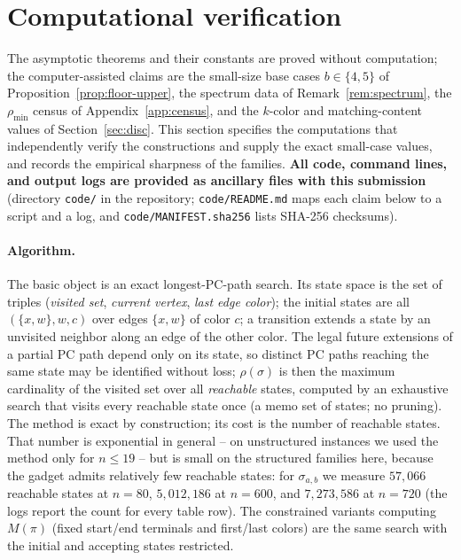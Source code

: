 \documentclass[11pt]{article}
\theoremstyle{definition}
\newcommand{\pmin}{\rho_{\min}}
\begin{document}
\section{Computational verification}\label{sec:comp}

The asymptotic theorems and their constants are proved without computation; the
computer-assisted claims are the small-size base cases $b \in \{4,5\}$ of
Proposition~\ref{prop:floor-upper}, the spectrum data of Remark~\ref{rem:spectrum},
the $\pmin$ census of Appendix~\ref{app:census}, and the $k$-color and
matching-content values of Section~\ref{sec:disc}. This section specifies the
computations that independently verify the constructions and supply the exact
small-case values, and records the empirical sharpness of the families.
\textbf{All code, command lines, and output logs are provided as ancillary files with
this submission} (directory \texttt{code/} in the repository; \texttt{code/README.md}
maps each claim
below to a script and a log, and \texttt{code/MANIFEST.sha256} lists SHA-256 checksums).

\paragraph{Algorithm.} The basic object is an exact longest-PC-path search. Its state
space is the set of triples (\emph{visited set}, \emph{current vertex}, \emph{last edge
color}); the initial states are all $(\{x, w\}, w, c)$ over edges $\{x, w\}$ of color
$c$; a transition extends a state by an unvisited neighbor along an edge of the other
color. The legal future extensions of a partial PC path depend only on its state, so
distinct PC paths reaching the same state may be identified without loss; $\rho(\sigma)$
is then the maximum cardinality of the visited set over all \emph{reachable} states,
computed by an exhaustive search that visits every reachable state once (a memo set of
states; no pruning). The method is exact by construction; its cost is the number of
reachable states. That number is exponential in general -- on unstructured instances we
used the method only for $n \le 19$ -- but is small on the structured families here,
because the gadget admits relatively few reachable states: for $\sigma_{a,b}$ we measure
$57{,}066$
reachable states at $n = 80$, $5{,}012{,}186$ at $n = 600$, and $7{,}273{,}586$ at
$n = 720$ (the logs report the count for every table row). The constrained variants
computing $M(\pi)$ (fixed start/end terminals and first/last colors) are the same search
with the initial and accepting states restricted.
\end{document}
